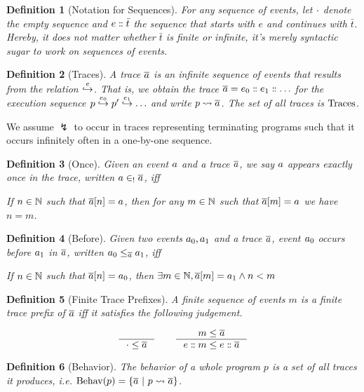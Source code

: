 \documentclass[a4paper,names,dvipsnames]{article}
\newtheorem{definition}{Definition}
\begin{document}
\begin{definition}[Notation for Sequences]
  For any sequence of events, let $\seqnil$ denote the empty sequence and $\seqcons{e}{\bar{t}}$ the sequence that starts with $e$ and continues with $\bar{t}$.
  Hereby, it does not matter whether $\bar{t}$ is finite or infinite, it's merely syntactic sugar to work on sequences of events.
\end{definition}

\begin{definition}[Traces]
  A trace $\trace$ is an infinite sequence of events that results from the relation $\singlestep$.
  That is, we obtain the trace $\trace=\seqcons{e_{0}}{\seqcons{e_{1}}{\dots}}$ for the execution sequence $\estep{p}{e_{0}}{\estep{p'}{e_{1}}{\dots}}$ and write $\mktrace{p}{\trace}$.
  The set of all traces is $\traces$.
\end{definition}
\noindent
We assume $\lightning$ to occur in traces representing terminating programs such that it occurs infinitely often in a one-by-one sequence.

\begin{definition}[Once]
  Given an event $\event$ and a trace $\trace$, we say $\event$ appears exactly once in the trace, written $\event\in_{!}\trace$, iff

  If $n\in\nat$ such that $\trace{[n]}=\event$, then for any $m\in\nat$ such that $\trace{[m]}=\event$ we have $n = m$.
\end{definition}

\begin{definition}[Before]
  Given two events $\event[_0],\event[_1]$ and a trace $\trace$, event $\event[_0]$ occurs before $\event[_1]$ in $\trace$, written
  $\event{_0}\le_{\trace}\event{_1}$, iff

  If $n\in\nat$ such that $\trace{[n]} = \event[_{0}]$, then $\exists m\in\nat, \trace{[m]} = \event[_1] \wedge n< m$
\end{definition}


\begin{definition}[Finite Trace Prefixes]
  A finite sequence of events $m$ is a finite trace prefix of $\trace$ iff it satisfies the following judgement.

  $$
    \inference{}{\cdot\le\trace}\hspace{2em}\inference{m\le\trace}{\seqcons{e}{m}\le \seqcons{e}{\trace}}
  $$
\end{definition}

\begin{definition}[Behavior]
  The behavior of a whole program $p$ is a set of all traces it produces, i.e. $\behav{p}=\{\trace\ |\ \mktrace{p}{\trace}\}$.
\end{definition}
\end{document}
